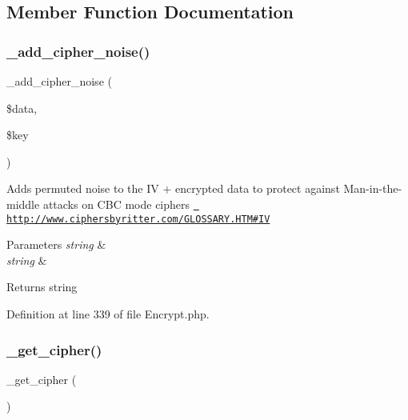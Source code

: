 \subsection{Member Function Documentation}
\mbox{\label{class_c_i___encrypt_ada423e99876a54e7bc33afc9899d01a2}} 
\subsubsection{\texorpdfstring{\_add\_cipher\_noise()}{\_add\_cipher\_noise()}}
{\footnotesize\ttfamily \+\_\+add\+\_\+cipher\+\_\+noise (\begin{DoxyParamCaption}\item[{}]{\$data,  }\item[{}]{\$key }\end{DoxyParamCaption})\hspace{0.3cm}{\ttfamily [protected]}}

Adds permuted noise to the IV + encrypted data to protect against Man-\/in-\/the-\/middle attacks on C\+BC mode ciphers \href{http://www.ciphersbyritter.com/GLOSSARY.HTM\#IV}{\texttt{ http\+://www.\+ciphersbyritter.\+com/\+G\+L\+O\+S\+S\+A\+R\+Y.\+H\+T\+M\#\+IV}}


\begin{DoxyParams}{Parameters}
{\em string} & \\
\hline
{\em string} & \\
\hline
\end{DoxyParams}
\begin{DoxyReturn}{Returns}
string 
\end{DoxyReturn}


Definition at line 339 of file Encrypt.\+php.

\mbox{\label{class_c_i___encrypt_a663ee049f0b7596a0e4925a3eb2db062}} 
\subsubsection{\texorpdfstring{\_get\_cipher()}{\_get\_cipher()}}
{\footnotesize\ttfamily \+\_\+get\+\_\+cipher (\begin{DoxyParamCaption}{ }\end{DoxyParamCaption})\hspace{0.3cm}{\ttfamily [protected]}}


